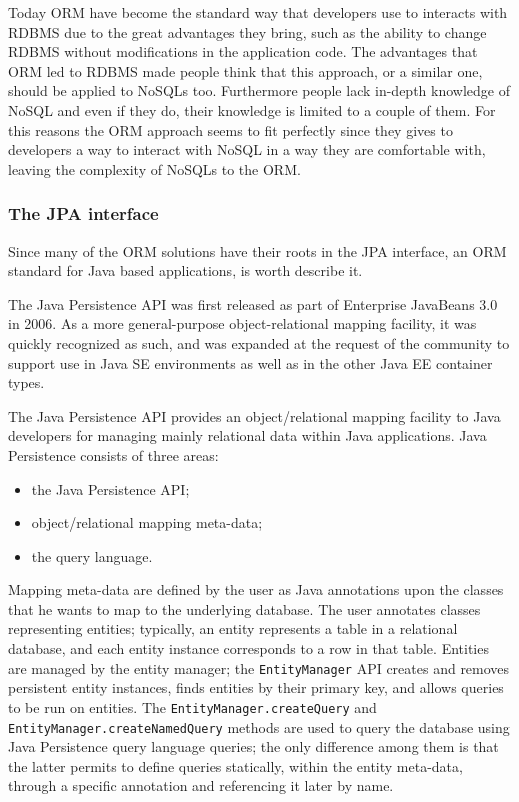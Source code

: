 \noindent Today ORM have become the standard way that developers use to interacts with RDBMS due to the great advantages they bring, such as the ability to change RDBMS without modifications in the application code.
The advantages that ORM led to RDBMS made people think that this approach, or a similar one, should be applied to NoSQLs too. 
Furthermore people lack in-depth knowledge of NoSQL and even if they do, their knowledge is limited to a couple of them. For this reasons the ORM approach seems to fit perfectly since they gives to developers a way to interact with NoSQL in a way they are comfortable with, leaving the complexity of NoSQLs to the ORM.

\subsubsection{The JPA interface}
\label{sec:jpa}
Since many of the ORM solutions have their roots in the JPA interface, an ORM standard for Java based applications, is worth describe it.

\newparagraph The Java Persistence API \cite{book:projpa2} was first released as part of Enterprise JavaBeans 3.0 in 2006. As a more general-purpose object-relational mapping facility, it was quickly recognized as such, and was expanded at the request of the community to support use in Java SE environments as well as in the other Java EE container types.

\noindent The Java Persistence API provides an object/relational mapping facility to Java developers for managing mainly relational data within Java applications. Java Persistence consists of three areas:
\begin{itemize}
\item the Java Persistence API;
\item object/relational mapping meta-data;
\item the query language.
\end{itemize}

\noindent Mapping meta-data are defined by the user as Java annotations upon the classes that he wants to map to the underlying database.
The user annotates classes representing entities; typically, an entity represents a table in a relational database, and each entity instance corresponds to a row in that table. Entities are managed by the entity manager; the \texttt{EntityManager} API creates and removes persistent entity instances, finds entities by their primary key, and allows queries to be run on entities. 
The \texttt{EntityManager.createQuery} and \texttt{EntityManager.createNamedQuery} methods are used to query the database using Java Persistence query language queries; the only difference among them is that the latter permits to define queries statically, within the entity meta-data, through a specific annotation and referencing it later by name.


